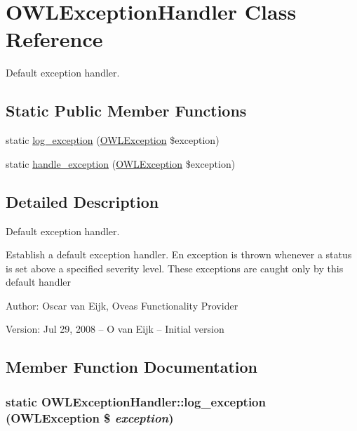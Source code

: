 \hypertarget{classOWLExceptionHandler}{
\section{OWLExceptionHandler Class Reference}
\label{classOWLExceptionHandler}
}
Default exception handler.  


\subsection*{Static Public Member Functions}
\begin{CompactItemize}
\item 
static \hyperlink{classOWLExceptionHandler_760bf3e7d648a7714abf5720f39369d8}{log\_\-exception} (\hyperlink{classOWLException}{OWLException} \$exception)
\item 
static \hyperlink{classOWLExceptionHandler_9d10d18ec1d1eb31b5d8ef2a0f288402}{handle\_\-exception} (\hyperlink{classOWLException}{OWLException} \$exception)
\end{CompactItemize}


\subsection{Detailed Description}
Default exception handler. 

Establish a default exception handler. En exception is thrown whenever a status is set above a specified severity level. These exceptions are caught only by this default handler \begin{Desc}
\item[Author:]Oscar van Eijk, Oveas Functionality Provider \end{Desc}
\begin{Desc}
\item[Version:]Jul 29, 2008 -- O van Eijk -- Initial version \end{Desc}


\subsection{Member Function Documentation}
\hypertarget{classOWLExceptionHandler_760bf3e7d648a7714abf5720f39369d8}{
\subsubsection{\setlength{\rightskip}{0pt plus 5cm}static OWLExceptionHandler::log\_\-exception ({\bf OWLException} \$ {\em exception})}}
\label{classOWLExceptionHandler_760bf3e7d648a7714abf5720f39369d8}


